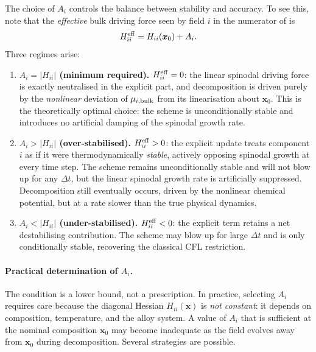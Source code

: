 {The choice of $A_i$ controls the balance between stability and
accuracy.  To see this, note that the \emph{effective} bulk driving
force seen by field $i$ in the numerator of  is
%
\begin{equation}\label{eq:eyre_Heff}
    H^{\rm eff}_{ii}
    = H_{ii}(\boldsymbol{x}_0) + A_i.
\end{equation}
%
Three regimes arise:

\begin{enumerate}
    \item \textbf{$A_i = |H_{ii}|$ (minimum required).}
          $H^{\rm eff}_{ii} = 0$: the linear spinodal driving force
          is exactly neutralised in the explicit part, and decomposition
          is driven purely by the \emph{nonlinear} deviation of
          $\mu_{i,\rm bulk}$ from its linearisation about $\boldsymbol{x}_0$.
          This is the theoretically optimal choice: the scheme is
          unconditionally stable and introduces no artificial damping
          of the spinodal growth rate.

    \item \textbf{$A_i > |H_{ii}|$ (over-stabilised).}
          $H^{\rm eff}_{ii} > 0$: the explicit update treats component
          $i$ as if it were thermodynamically \emph{stable}, actively
          opposing spinodal growth at every time step.  The scheme
          remains unconditionally stable and will not blow up for any
          $\Delta t$, but the linear spinodal growth rate is
          artificially suppressed.  Decomposition still eventually
          occurs, driven by the nonlinear chemical potential, but at a
          rate slower than the true physical dynamics.

    \item \textbf{$A_i < |H_{ii}|$ (under-stabilised).}
          $H^{\rm eff}_{ii} < 0$: the explicit term retains a net
          destabilising contribution.  The scheme may blow up for large
          $\Delta t$ and is only conditionally stable, recovering the
          classical CFL restriction.
\end{enumerate}

\paragraph{Practical determination of $A_i$.}

The condition  is a lower bound, not a
prescription.  In practice, selecting $A_i$ requires care because the
diagonal Hessian $H_{ii}(\boldsymbol{x})$ is \emph{not constant}: it
depends on composition, temperature, and the alloy system.  A value of
$A_i$ that is sufficient at the nominal composition $\boldsymbol{x}_0$
may become inadequate as the field evolves away from $\boldsymbol{x}_0$
during decomposition.  Several strategies are possible.

}
